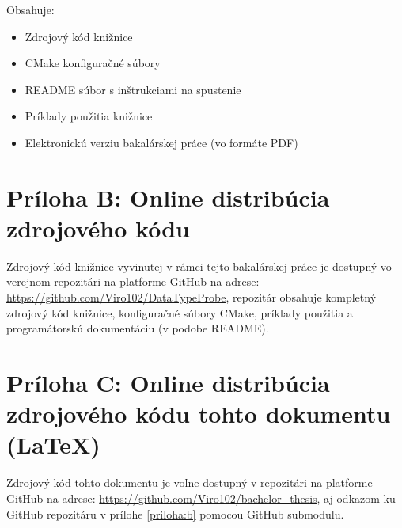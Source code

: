 \documentclass[11pt]{article}
\begin{document}
\noindent Obsahuje:

\begin{itemize}
  \item Zdrojový kód knižnice
  \item CMake konfiguračné súbory
  \item README súbor s inštrukciami na spustenie
  \item Príklady použitia knižnice
  \item Elektronickú verziu bakalárskej práce (vo formáte PDF)
\end{itemize}

\newpage
\section*{Príloha B: Online distribúcia zdrojového kódu}
\label{priloha:b}

Zdrojový kód knižnice vyvinutej v rámci tejto bakalárskej práce je dostupný vo verejnom repozitári na platforme GitHub na adrese: \url{https://github.com/Viro102/DataTypeProbe}, repozitár obsahuje kompletný zdrojový kód knižnice, konfiguračné súbory CMake, príklady použitia a programátorskú dokumentáciu (v podobe README).

\newpage
\section*{Príloha C: Online distribúcia zdrojového kódu tohto dokumentu (LaTeX)}
\label{priloha:c}

Zdrojový kód tohto dokumentu je voľne dostupný v repozitári na platforme GitHub na adrese: \url{https://github.com/Viro102/bachelor_thesis}, aj odkazom ku GitHub repozitáru v prílohe \ref{priloha:b} pomocou GitHub submodulu.
\end{document}
